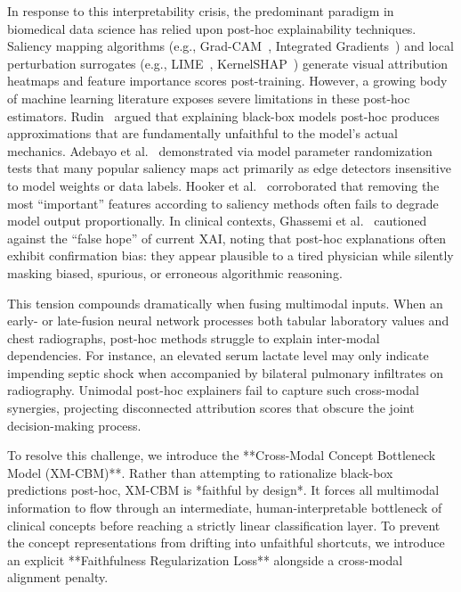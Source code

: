 \documentclass[10pt,journal,compsoc,twocolumn]{IEEEtran}
\begin{document}
In response to this interpretability crisis, the predominant paradigm in biomedical data science has relied upon post-hoc explainability techniques. Saliency mapping algorithms (e.g., Grad-CAM~\cite{selvaraju2017gradcam}, Integrated Gradients~\cite{sundararajan2017axiomatic}) and local perturbation surrogates (e.g., LIME~\cite{ribeiro2016why}, KernelSHAP~\cite{lundberg2017unified}) generate visual attribution heatmaps and feature importance scores post-training. However, a growing body of machine learning literature exposes severe limitations in these post-hoc estimators. Rudin~\cite{rudin2019stop} argued that explaining black-box models post-hoc produces approximations that are fundamentally unfaithful to the model's actual mechanics. Adebayo et al.~\cite{adebayo2018sanity} demonstrated via model parameter randomization tests that many popular saliency maps act primarily as edge detectors insensitive to model weights or data labels. Hooker et al.~\cite{hooker2019benchmark} corroborated that removing the most ``important'' features according to saliency methods often fails to degrade model output proportionally. In clinical contexts, Ghassemi et al.~\cite{ghassemi2021false} cautioned against the ``false hope'' of current XAI, noting that post-hoc explanations often exhibit confirmation bias: they appear plausible to a tired physician while silently masking biased, spurious, or erroneous algorithmic reasoning.

This tension compounds dramatically when fusing multimodal inputs. When an early- or late-fusion neural network processes both tabular laboratory values and chest radiographs, post-hoc methods struggle to explain inter-modal dependencies. For instance, an elevated serum lactate level may only indicate impending septic shock when accompanied by bilateral pulmonary infiltrates on radiography. Unimodal post-hoc explainers fail to capture such cross-modal synergies, projecting disconnected attribution scores that obscure the joint decision-making process.

To resolve this challenge, we introduce the **Cross-Modal Concept Bottleneck Model (XM-CBM)**. Rather than attempting to rationalize black-box predictions post-hoc, XM-CBM is *faithful by design*. It forces all multimodal information to flow through an intermediate, human-interpretable bottleneck of clinical concepts before reaching a strictly linear classification layer. To prevent the concept representations from drifting into unfaithful shortcuts, we introduce an explicit **Faithfulness Regularization Loss** alongside a cross-modal alignment penalty. 
\end{document}
